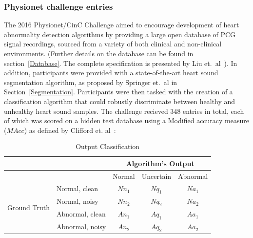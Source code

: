 \documentclass[titlepage, 12pt]{scrartcl} \usepackage{enumitem}
\begin{document}
\subsubsection{Physionet challenge entries}
\doublespacing
The 2016 Physionet/CinC Challenge aimed to encourage development of heart
abnormality detection algorithms by providing a large open database of PCG
signal recordings, sourced from a variety of both clinical and non-clinical
environments. (Further details on the database can be found in
section~\ref{Database}. The complete specification is presented by Liu et.\
al~\parencite{Liu2016}). In addition, participants were provided with a
state-of-the-art heart sound segmentation algorithm, as proposed by Springer
et.\ al in Section~\ref{Segmentation}. Participants were then tasked with the
creation of a classification algorithm that could robustly discriminate between
healthy and unhealthy heart sound samples. The challenge recieved 348 entries
in total, each of which was scored on a hidden test database
using a Modified accuracy measure ($MAcc$) as defined by Clifford et.
al~\parencite{Clifford2016}:
\begin{table}[htbp]
\centering
\caption{Output Classification}
\label{OutputClassification}
\doublespacing
\begin{tabular}{llccc}
\hline
                              &                 & \multicolumn{3}{c}{Algorithm's Output}                                                    \\ \hline
                              &                 & \multicolumn{1}{l}{Normal} & \multicolumn{1}{l}{Uncertain} & \multicolumn{1}{l}{Abnormal} \\
\multirow{4}{*}{Ground Truth} & Normal, clean   & $Nn_1$                     & $Nq_1$                        & $Na_1$                       \\
                              & Normal, noisy   & $Nn_2$                     & $Nq_2$                        & $Na_2$                       \\
                              & Abnormal, clean & $An_1$                     & $Aq_1$                        & $Aa_1$                       \\
                              & Abnormal, noisy & $An_2$                     & $Aq_2$                        & $Aa_2$                       \\ \hline
\end{tabular}
\end{table}
\end{document}
